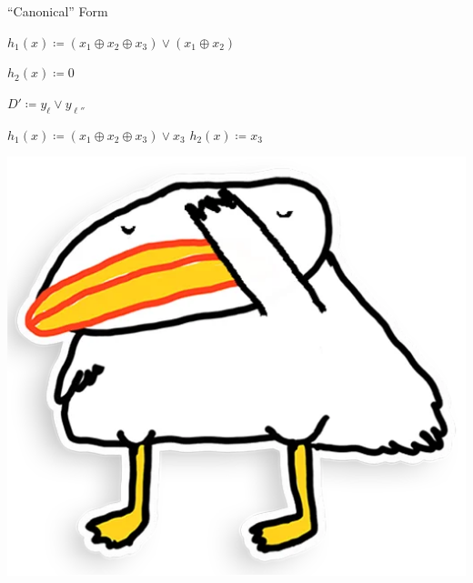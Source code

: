 \begin{frame}{``Canonical'' Form}
\begin{minipage}{0.4\linewidth}
        $h_1(x) \coloneqq (x_1 \oplus x_2 \oplus x_3) \lor (x_1 \oplus x_2)$
        
        $h_2(x) \coloneqq 0$
    \end{minipage}
    \begin{minipage}{0.4\linewidth}
        \centering
        $D' \coloneqq y_{\ell} \lor y_{\ell''}$
        
        $h_1(x) \coloneqq (x_1 \oplus x_2 \oplus x_3) \lor x_3$
        $h_2(x) \coloneqq x_3$
    \end{minipage}

    \pause
    \vspace{0.2cm}
    \centering
    \includegraphics[scale = 0.1]{pics/utia-shame.png}
\end{frame}


